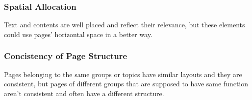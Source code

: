 \subsubsection{Spatial Allocation}
Text and contents are well placed and reflect their relevance, but these elements could use pages' horizontal space in a better way.

\subsubsection{Concistency of Page Structure}
Pages belonging to the same groups or topics have similar layouts and they are consistent, but pages of different groups that are supposed to have same function aren't consistent and often have a different structure.